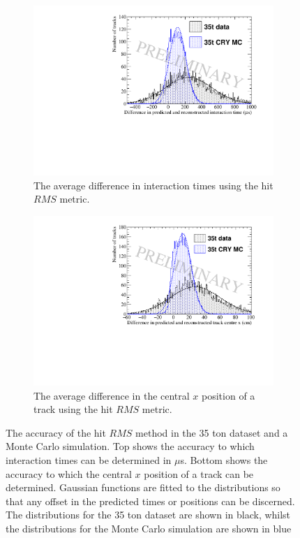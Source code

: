 \begin{figure}[h!]
  \centering
  \begin{subfigure}{0.6\textwidth}
    \centering
    \includegraphics[width=\textwidth]{Overlay_AvTimeDiff_RMS}
    \caption{The average difference in interaction times using the hit $RMS$ metric.}
    \label{fig:DiffOverlayAvDiff_RMS_T}
  \end{subfigure}

  \begin{subfigure}{0.6\textwidth}
    \centering
    \includegraphics[width=\textwidth]{Overlay_AvXPosDiff_RMS}
    \caption{The average difference in the central $x$ position of a track using the hit $RMS$ metric.}
    \label{fig:DiffOverlayAvDiff_RMS_X}
  \end{subfigure}
  \caption[Comparing the accuracy of the hit $RMS$ method in the 35 ton dataset and a Monte Carlo simulation]
          {The accuracy of the hit $RMS$ method in the 35 ton dataset and a Monte Carlo simulation. Top shows the accuracy to which interaction times can be determined in $\mu$s. Bottom shows the accuracy to which the central $x$ position of a track can be determined. Gaussian functions are fitted to the distributions so that any offset in the predicted times or positions can be discerned. The distributions for the 35 ton dataset are shown in black, whilst the distributions for the Monte Carlo simulation are shown in blue}
  \label{fig:DiffOverlayAvDiff_RMS}
\end{figure}

